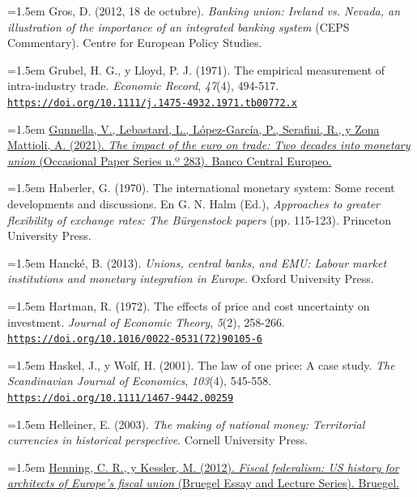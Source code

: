 \documentclass[10pt,a4paper]{article}
\begin{document}
\noindent\hangindent=1.5em Gros, D. (2012, 18 de octubre). \textit{Banking union: Ireland vs. Nevada, an illustration of the importance of an integrated banking system} (CEPS Commentary). Centre for European Policy Studies.

\noindent\hangindent=1.5em Grubel, H. G., y Lloyd, P. J. (1971). The empirical measurement of intra-industry trade. \textit{Economic Record}, \textit{47}(4), 494-517. \href{https://doi.org/10.1111/j.1475-4932.1971.tb00772.x}{\nolinkurl{https://doi.org/10.1111/j.1475-4932.1971.tb00772.x}}

\noindent\hangindent=1.5em \href{https://www.ecb.europa.eu/pub/pdf/scpops/ecb.op283~a2ff6f5481.en.pdf}{Gunnella, V., Lebastard, L., López-García, P., Serafini, R., y Zona Mattioli, A. (2021). \textit{The impact of the euro on trade: Two decades into monetary union} (Occasional Paper Series n.º 283). Banco Central Europeo.}

\noindent\hangindent=1.5em Haberler, G. (1970). The international monetary system: Some recent developments and discussions. En G. N. Halm (Ed.), \textit{Approaches to greater flexibility of exchange rates: The Bürgenstock papers} (pp. 115-123). Princeton University Press.

\noindent\hangindent=1.5em Hancké, B. (2013). \textit{Unions, central banks, and EMU: Labour market institutions and monetary integration in Europe}. Oxford University Press.

\noindent\hangindent=1.5em Hartman, R. (1972). The effects of price and cost uncertainty on investment. \textit{Journal of Economic Theory}, \textit{5}(2), 258-266. \href{https://doi.org/10.1016/0022-0531(72)90105-6}{\nolinkurl{https://doi.org/10.1016/0022-0531(72)90105-6}}

\noindent\hangindent=1.5em Haskel, J., y Wolf, H. (2001). The law of one price: A case study. \textit{The Scandinavian Journal of Economics}, \textit{103}(4), 545-558. \href{https://doi.org/10.1111/1467-9442.00259}{\nolinkurl{https://doi.org/10.1111/1467-9442.00259}}

\noindent\hangindent=1.5em Helleiner, E. (2003). \textit{The making of national money: Territorial currencies in historical perspective}. Cornell University Press.

\noindent\hangindent=1.5em \href{https://www.bruegel.org/essay/fiscal-federalism-us-history-architects-europes-fiscal-union}{Henning, C. R., y Kessler, M. (2012). \textit{Fiscal federalism: US history for architects of Europe's fiscal union} (Bruegel Essay and Lecture Series). Bruegel.}
\end{document}
